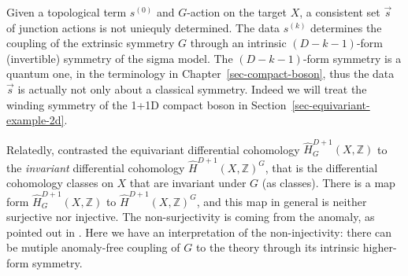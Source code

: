 \documentclass[11pt,toc=bibliography]{scrbook}
\numberwithin{equation}{section}
\begin{document}
\begin{tcolorbox}[enhanced jigsaw, opacityback=0, opacitybacktitle=0.6, leftrule=.75mm, arc=.35mm, coltitle=black, breakable, colframe=quarto-callout-note-color-frame, titlerule=0mm, colback=white, bottomrule=.15mm, left=2mm, colbacktitle=quarto-callout-note-color!10!white, toptitle=1mm, bottomtitle=1mm, title=\textcolor{quarto-callout-note-color}{\faInfo}\hspace{0.5em}{\(s^{(0)}\) does not fix \(s^{(k)}\), \(k\ge 1\).}, rightrule=.15mm, toprule=.15mm]

Given a topological term \(s^{(0)}\) and \(G\)-action on the target
\(X\), a consistent set \(\vec{s}\) of junction actions is not uniequly
determined. The data \(s^{(k)}\) determines the coupling of the
extrinsic symmetry \(G\) through an intrinsic \((D-k-1)\)-form
(invertible) symmetry of the sigma model.\footnotemark{} The
\((D-k-1)\)-form symmetry is a quantum one, in the terminology in
Chapter~\ref{sec-compact-boson}, thus the data \(\vec{s}\) is actually
not only about a classical symmetry. Indeed we will treat the winding
symmetry of the 1+1D compact boson in
Section~\ref{sec-equivariant-example-2d}.

Relatedly, \textcite{Davighi:2020vcm} contrasted the equivariant
differential cohomology \(\hat{H}_G^{D+1}(X,\mathbb{Z})\) to the
\emph{invariant} differential cohomology
\(\hat{H}^{D+1}(X,\mathbb{Z})^G\), that is the differential cohomology
classes on \(X\) that are invariant under \(G\) (as classes). There is a
map form \(\hat{H}_G^{D+1}(X,\mathbb{Z})\) to
\(\hat{H}^{D+1}(X,\mathbb{Z})^G\), and this map in general is neither
surjective nor injective. The non-surjectivity is coming from the
anomaly, as pointed out in \textcite{Davighi:2020vcm}. Here we have an
interpretation of the non-injectivity: there can be mutiple anomaly-free
coupling of \(G\) to the theory through its intrinsic higher-form
symmetry.

\end{tcolorbox}

\end{document}
